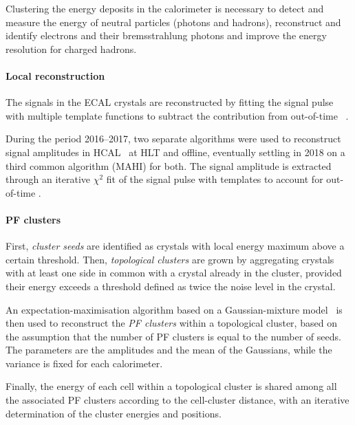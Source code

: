 \label{sec:clusters}
Clustering the energy deposits in the calorimeter is necessary to
detect and measure the energy of neutral particles (photons and hadrons),
reconstruct and identify electrons and their bremsstrahlung photons
and improve the energy resolution for charged hadrons.

\paragraph{Local reconstruction\\}

The signals in the ECAL crystals are reconstructed by fitting the signal pulse
with multiple template functions to subtract the contribution from out-of-time \pileup~\cite{CMS-EGM-18-001}.

During the period 2016--2017, two separate algorithms were used
to reconstruct signal amplitudes in HCAL~\cite{CMS-PRF-22-001} at HLT and offline,
eventually settling in 2018 on a third common algorithm (MAHI) for both.
The signal amplitude is extracted through an iterative $\chi^2$ fit of the signal pulse
with templates to account for out-of-time \pileup.

\paragraph{PF clusters\\}
First, \textit{cluster seeds} are identified as crystals with local energy maximum above a certain threshold.
Then, \textit{topological clusters} are grown by aggregating crystals with at least one side in common with a crystal already in the cluster,
provided their energy exceeds a threshold defined as twice the noise level in the crystal.

An expectation-maximisation algorithm based on a Gaussian-mixture model~\cite{CMS-NOTE-2005-001}
is then used to reconstruct the \textit{PF clusters} within a topological cluster,
based on the assumption that the number of PF clusters is equal to the number of seeds.
The parameters are the amplitudes and the mean of the Gaussians, while the variance is fixed for each calorimeter.

Finally, the energy of each cell within a topological cluster is shared among all the associated PF clusters according to the cell-cluster distance,
with an iterative determination of the cluster energies and positions.
